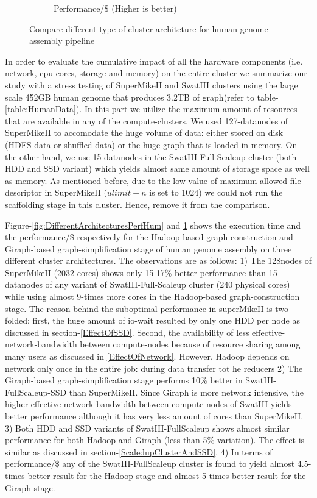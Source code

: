 \documentclass[conference]{IEEEtran}
\begin{document}
\begin{figure}[htb]
\begin{subfigure}[b]{0.23\textwidth}
                \caption{Performance/\$ (Higher is better)}
                \label{fig:DifferentArchitecturesPerfPerDollarHum}
        \end{subfigure}
        \caption{Compare different type of cluster architeture for human genome assembly pipeline}
  \label{fig:DifferentArchitectures}
\end{figure}  

In order to evaluate the cumulative impact of all the hardware components (i.e. network, cpu-cores, storage and memory) on the entire cluster we summarize our study with a stress testing of SuperMikeII and SwatIII clusters using the large scale 452GB human genome that produces 3.2TB of graph(refer to table-\ref{table:HumanData}).
In this part we utilize the maximum amount of resources that are available in any of the compute-clusters. 
We used 127-datanodes of SuperMikeII to accomodate the huge volume of data: either stored on disk (HDFS data or shuffled data) or the huge graph that is loaded in memory. 
On the other hand, we use 15-datanodes in the SwatIII-Full-Scaleup cluster (both HDD and SSD variant) which yields almost same amount of storage space as well as memory.
As mentioned before, due to the low value of maximum allowed file descriptor in SuperMikeII ($ulimit -n$ is set to 1024) we could not run the scaffolding stage in this cluster. Hence, remove it from the comparison.

Figure-\ref{fig:DifferentArchitecturesPerfHum} and \ref{fig:DifferentArchitecturesPerfPerDollarHum} shows the execution time and the performance/\$ respectively for the Hadoop-based graph-construction and Giraph-based graph-simplification stage of human genome assembly on three different cluster architectures.
The observations are as follows:
1) The 128nodes of SuperMikeII (2032-cores) shows only 15-17\% better performance than 15-datanodes of any variant of SwatIII-Full-Scaleup cluster (240 physical cores) while using almost 9-times more cores in the Hadoop-based graph-construction stage.
The reason behind the suboptimal performance in superMikeII is two folded: first, the huge amount of io-wait resulted by only one HDD per node as discussed in section-\ref{EffectOfSSD}. Second, the availability of less effective-network-bandwidth between compute-nodes because of resource sharing among many users as discussed in \ref{EffectOfNetwork}. However, Hadoop depends on network only once in the entire job: during data transfer tot he reducers
2) The Giraph-based graph-simplification stage performs 10\% better in SwatIII-FullScaleup-SSD than SuperMikeII. Since Giraph is more network intensive, the higher effective-network-bandwidth between compute-nodes of SwatIII yields better performance although it has very less amount of cores than SuperMikeII.
3) Both HDD and SSD variants of SwatIII-FullScaleup shows almost similar performance for both Hadoop and Giraph (less than 5\% variation). The effect is similar as discussed in section-\ref{ScaledupClusterAndSSD}.
4) In terms of performance/\$ any of the SwatIII-FullScaleup cluster is found to yield almost 4.5-times better result for the Hadoop stage and almost 5-times better result for the Giraph stage.
\end{document}
